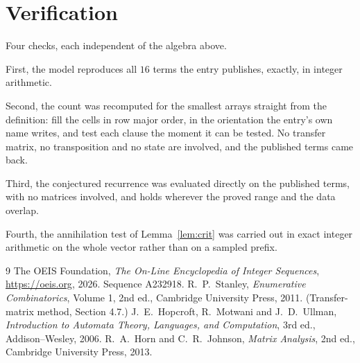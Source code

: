 \documentclass[11pt,a4paper]{article}
\theoremstyle{plain}
\theoremstyle{definition}
\begin{document}
\section{Verification}

Four checks, each independent of the algebra above.

First, the model reproduces all $16$ terms the entry publishes, exactly, in integer
arithmetic.

Second, the count was recomputed for the smallest arrays straight from the definition: fill the
cells in row major order, in the orientation the entry's own name writes, and test each clause
the moment it can be tested. No transfer matrix, no transposition and no state are involved,
and the published terms came back.

Third, the conjectured recurrence was evaluated directly on the published terms, with no
matrices involved, and holds wherever the proved range and the data overlap.

Fourth, the annihilation test of Lemma~\ref{lem:crit} was carried out in exact integer
arithmetic on the whole vector rather than on a sampled prefix.

\begin{thebibliography}{9}
 The OEIS Foundation, \emph{The On-Line Encyclopedia of Integer
Sequences}, \url{https://oeis.org}, 2026. Sequence A232918.
 R.~P.~Stanley, \emph{Enumerative Combinatorics}, Volume 1, 2nd ed.,
Cambridge University Press, 2011. (Transfer-matrix method, Section 4.7.)
 J.~E.~Hopcroft, R.~Motwani and J.~D.~Ullman, \emph{Introduction to Automata
Theory, Languages, and Computation}, 3rd ed., Addison--Wesley, 2006.
 R.~A.~Horn and C.~R.~Johnson, \emph{Matrix Analysis}, 2nd ed., Cambridge
University Press, 2013.
\end{thebibliography}
\end{document}
